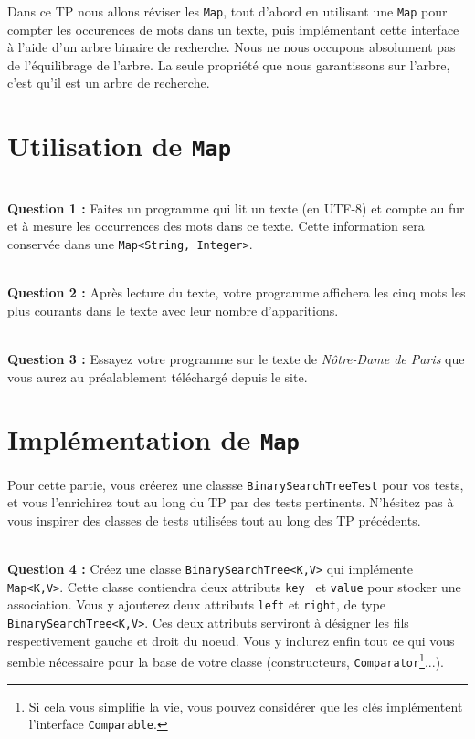 \documentclass[iutinfo,a4paper,nocorrections,10pt]{ustl-tdtp}
\date{\annee{2017}--\annee{2018}}
\begin{document}
\maketitle
\thispagestyle{empty}
\sloppy


Dans ce TP nous allons réviser les \texttt{Map}, tout d'abord en utilisant une \texttt{Map} pour compter les occurences de mots dans un texte, puis implémentant cette interface à l'aide d'un
arbre binaire de recherche. Nous ne nous occupons absolument pas de
l'équilibrage de l'arbre. La seule propriété que nous garantissons sur
l'arbre, c'est qu'il est un arbre de recherche.

\section*{Utilisation de \texttt{Map}}

~\\ \textbf{Question 1 :} Faites un programme qui lit un texte (en UTF-8) et compte au fur et à mesure les occurrences des mots dans ce texte. Cette information sera conservée dans une \texttt{Map<String, Integer>}.

~\\ \textbf{Question 2 :} Après lecture du texte, votre programme affichera les cinq mots les plus courants dans le texte avec leur nombre d'apparitions. 

~\\ \textbf{Question 3 :} Essayez votre programme sur le texte de \emph{Nôtre-Dame de Paris} que vous aurez au préalablement téléchargé depuis le site.

\section*{Implémentation de \texttt{Map}}

Pour cette partie, vous créerez une classse \texttt{BinarySearchTreeTest} pour vos tests, et vous l'enrichirez tout au long du TP par des tests pertinents. N'hésitez pas à vous inspirer des classes de tests utilisées tout au long des TP précédents.

~\\ \textbf{Question 4 :} Créez une classe \texttt{BinarySearchTree<K,V>} qui
implémente \texttt{Map<K,V>}. Cette classe contiendra deux attributs \texttt{key } et \texttt{value} pour stocker une association. Vous y ajouterez deux 
attributs \texttt{left} et \texttt{right}, de type
\texttt{BinarySearchTree<K,V>}. Ces deux attributs serviront à désigner les fils
respectivement gauche et droit du noeud. Vous y inclurez enfin tout ce qui vous
semble nécessaire pour la base de votre classe
(constructeurs, \texttt{Comparator}\footnote{Si cela vous simplifie la vie, vous pouvez considérer que les clés implémentent l'interface \texttt{Comparable}.}...).
\end{document}
